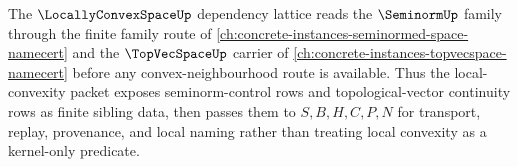 The $\LocallyConvexSpaceUp$ dependency lattice reads the $\SeminormUp$ family through the finite family route of \autoref{ch:concrete-instances-seminormed-space-namecert} and the $\TopVecSpaceUp$ carrier of \autoref{ch:concrete-instances-topvecspace-namecert} before any convex-neighbourhood route is available. Thus the local-convexity packet exposes seminorm-control rows and topological-vector continuity rows as finite sibling data, then passes them to $S,B,H,C,P,N$ for transport, replay, provenance, and local naming rather than treating local convexity as a kernel-only predicate.
